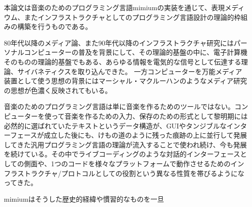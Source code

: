 本論文は音楽のためのプログラミング言語mimiumの実装を通じて、表現メディウム、またインフラストラクチャとしてのプログラミング言語設計の理論的枠組みの構築を行うものである。

80年代以降のメディア論、また90年代以降のインフラストラクチャ研究にはパーソナルコンピューターの普及を背景にして、その理論的基盤の中に、電子計算機そのものの理論的基盤でもある、あらゆる情報を電気的な信号として伝達する理論、サイバネティクスを取り込んできた。
一方コンピューターを万能メディア装置として使う思想の背景にはマーシャル・マクルーハンのようなメディア研究の思想が色濃く反映されてもいる。

音楽のためのプログラミング言語は単に音楽を作るためのツールではない。コンピューターを使って音楽を作るための入力、保存のための形式として黎明期には必然的に選ばれていたテキストというデータ構造が、GUIやタンジブルなインターフェースが成立した後にも、けもの道のように残った痕跡の上に並行して発展してきた汎用プログラミング言語の理論が流入することで使われ続け、今も発展を続けている。その中でライブコーディングのような対話的インターフェースとしての側面や、1つのコードを様々なプラットフォームで動作させるためのインフラストラクチャ/プロトコルとしての役割という異なる性質を帯びるようになってきた。

mimiumはそうした歴史的経緯や慣習的なものを一旦
